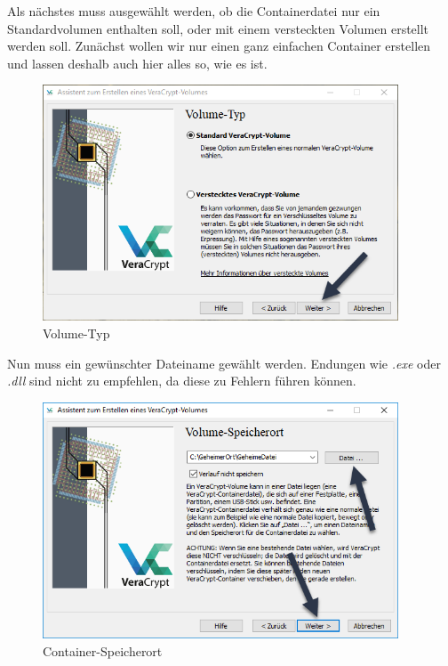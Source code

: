 \documentclass[12pt,a4paper]{scrreprt}
\begin{document}
\newpage

\noindent Als nächstes muss ausgewählt werden, ob die Containerdatei nur ein Standardvolumen enthalten soll, oder mit einem versteckten Volumen erstellt werden soll. Zunächst wollen wir nur einen ganz einfachen Container erstellen und lassen deshalb auch hier alles so, wie es ist.

\begin{figure}[h]
\begin{center}
\includegraphics[width=300pt]{media/volumetype.png}
\caption{Volume-Typ}
\label{voltype}
\end{center}
\end{figure}

\noindent Nun muss ein gewünschter Dateiname gewählt werden. Endungen wie \textit{.exe} oder \textit{.dll} sind nicht zu empfehlen, da diese zu Fehlern führen können.

\begin{figure}[h]
\begin{center}
\includegraphics[width=300pt]{media/volumesavelocation.png}
\caption{Container-Speicherort}
\label{volloc}
\end{center}
\end{figure}
\end{document}
